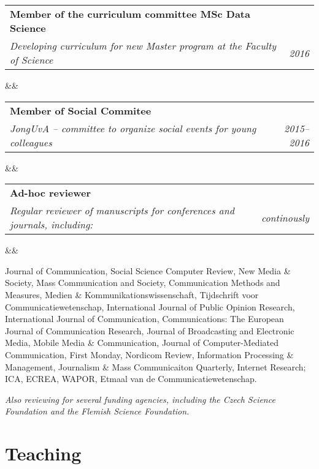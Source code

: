 \documentclass[11pt,a4paper,sans]{moderncv}
\makeatletter
\renewcommand*{\cventry}[7][.25em]{
	\begin{tabular*}{\textwidth}{p{13cm}@{\extracolsep{\fill}}r}%
		{\bfseries #4} & {\bfseries #5} \\%
		{\itshape #3\ifthenelse{\equal{#6}{}}{}{, #6}} & {\itshape #2}\\%
	\end{tabular*}%
	\ifx&#7&%
	\else{\\\vbox{\small#7}}\fi%
        \par\addvspace{#1}}
\makeatother
\begin{document}
\cventry{2016}{Developing curriculum for new Master program at the Faculty of Science}{Member of the curriculum committee MSc Data Science}{}{}{}

\cventry{2015--2016}{JongUvA -- committee to organize social events for young colleagues}{Member of Social Commitee}{}{}{}

\cventry{continously}{Regular reviewer of manuscripts for conferences and journals, including:}{Ad-hoc reviewer}{}{}{}
Journal of Communication, Social Science Computer
Review, New Media \& Society, Mass Communication and Society,
Communication Methods and Measures, Medien \&
Kommunikationswissenschaft, Tijdschrift voor
Communicatiewetenschap, International Journal of Public Opinion
Research, International Journal of Communication,
Communications: The European Journal of Communication
Research, Journal of Broadcasting and Electronic Media, Mobile
Media \& Communication, Journal of Computer-Mediated
Communication, First Monday, Nordicom Review, Information Processing \& Management,
Journalism \& Mass Communicaiton Quarterly, Internet Research;
ICA, ECREA, WAPOR, Etmaal van de Communicatiewetenschap.

\emph{Also reviewing for several funding agencies, including the Czech
Science Foundation and the Flemish Science Foundation.} \newline





\section{Teaching}










\end{document}
